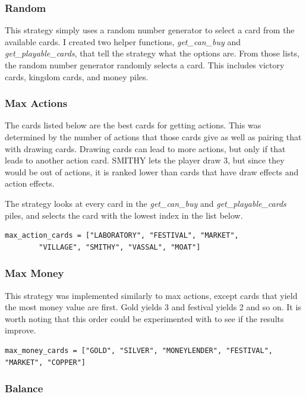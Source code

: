 \documentclass[11pt, oneside]{article}   	%
\begin{document}
\subsubsection{Random}

This strategy simply uses a random number generator to select a card from the available cards. I created two helper functions, \textit{get\_can\_buy} and \textit{get\_playable\_cards}, that tell the strategy what the options are. From those lists, the random number generator randomly selects a card. This includes victory cards, kingdom cards, and money piles. 

\subsubsection{Max Actions}

The cards listed below are the best cards for getting actions. This was determined by the number of actions that those cards give as well as pairing that with drawing cards. Drawing cards can lead to more actions, but only if that leads to another action card. SMITHY lets the player draw 3, but since they would be out of actions, it is ranked lower than cards that have draw effects and action effects. 

The strategy looks at every card in the \textit{get\_can\_buy} and \textit{get\_playable\_cards} piles, and selects the card with the lowest index in the list below. 

\begin{verbatim}
max_action_cards = ["LABORATORY", "FESTIVAL", "MARKET", 
		"VILLAGE", "SMITHY", "VASSAL", "MOAT"]
\end{verbatim}

\subsubsection{Max Money}

This strategy was implemented similarly to max actions, except cards that yield the most money value are first. Gold yields 3 and festival yields 2 and so on. It is worth noting that this order could be experimented with to see if the results improve. 

\begin{verbatim}
max_money_cards = ["GOLD", "SILVER", "MONEYLENDER", "FESTIVAL", "MARKET", "COPPER"]
\end{verbatim}

\subsubsection{Balance}
\end{document}

